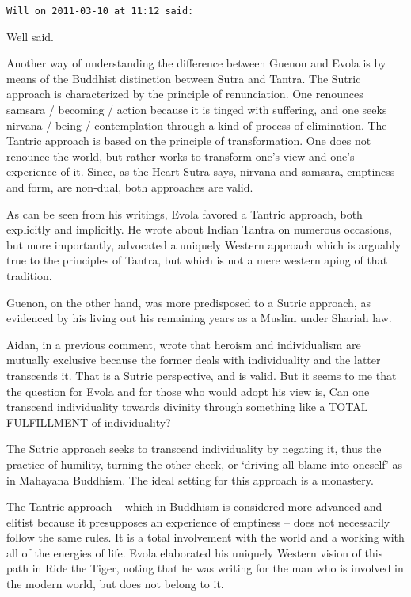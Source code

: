\begin{footnotesize}
\begin{sffamily}
\texttt{Will on 2011-03-10 at 11:12 said:}

Well said.

Another way of understanding the difference between Guenon and Evola is by means of the Buddhist distinction between Sutra and Tantra. The Sutric approach is characterized by the principle of renunciation. One renounces samsara / becoming / action because it is tinged with suffering, and one seeks nirvana / being / contemplation through a kind of process of elimination. The Tantric approach is based on the principle of transformation. One does not renounce the world, but rather works to transform one's view and one's experience of it. Since, as the Heart Sutra says, nirvana and samsara, emptiness and form, are non-dual, both approaches are valid.

As can be seen from his writings, Evola favored a Tantric approach, both explicitly and implicitly. He wrote about Indian Tantra on numerous occasions, but more importantly, advocated a uniquely Western approach which is arguably true to the principles of Tantra, but which is not a mere western aping of that tradition.

Guenon, on the other hand, was more predisposed to a Sutric approach, as evidenced by his living out his remaining years as a Muslim under Shariah law.

Aidan, in a previous comment, wrote that heroism and individualism are mutually exclusive because the former deals with individuality and the latter transcends it. That is a Sutric perspective, and is valid. But it seems to me that the question for Evola and for those who would adopt his view is, Can one transcend individuality towards divinity through something like a TOTAL FULFILLMENT of individuality?

The Sutric approach seeks to transcend individuality by negating it, thus the practice of humility, turning the other cheek, or `driving all blame into oneself' as in Mahayana Buddhism. The ideal setting for this approach is a monastery.

The Tantric approach -- which in Buddhism is considered more advanced and elitist because it presupposes an experience of emptiness -- does not necessarily follow the same rules. It is a total involvement with the world and a working with all of the energies of life. Evola elaborated his uniquely Western vision of this path in Ride the Tiger, noting that he was writing for the man who is involved in the modern world, but does not belong to it.


\end{sffamily}
\end{footnotesize}

